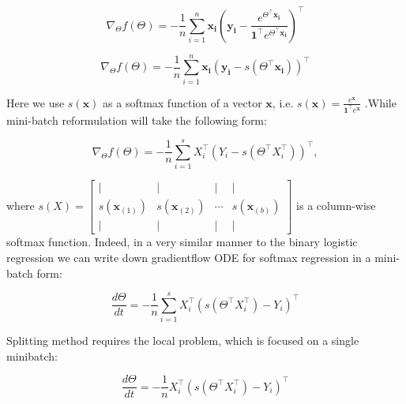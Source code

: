 \documentclass{article}
\newcommand{\vect}[1]{\boldsymbol{\mathbf{#1}}}
\begin{document}
\begin{equation}
\nabla_\Theta f(\Theta) = -\frac{1}{n} \sum_{i=1}^n\vect{x_i}\left(\vect{y_i} - \frac{ e^{\Theta^\top \vect{x_i}}}{\vect{1}^\top e^{\Theta^\top \vect{x_i}}}\right)^\top
\end{equation}

\begin{equation}
\nabla_\Theta f(\Theta) = -\frac{1}{n} \sum_{i=1}^n\vect{x_i}\left(\vect{y_i} - s\left(\Theta^\top \vect{x_i}\right)\right)^\top
\end{equation}


Here we use $s(\vect{x})$ as a softmax function of a vector $\vect{x}$, i.e. $s(\vect{x}) = \frac{e^{\vect{x}}}{\vect{1}^\top e^{\vect{x}}}$ .While mini-batch reformulation will take the following form:

\begin{equation}
\nabla_\Theta f(\Theta) = -\frac{1}{n} \sum_{i=1}^s X_i^\top\left(Y_i - s(\Theta^\top X_i^\top)\right)^\top,
\end{equation}

where $s(X) = \left[\begin{array}{cccc}| & | & | & | \\
s(\vect{x}_{(1)}) & s(\vect{x}_{(2)}) & \cdots & s(\vect{x}_{(b)}) \\
| & | & | & |
\end{array}\right]$ is a column-wise softmax function. Indeed, in a very similar manner to the binary logistic regression we can write down gradientflow ODE for softmax regression in a mini-batch form:

\begin{equation}
\frac{d \Theta}{d t} = - \frac{1}{n} \sum_{i=1}^s X_i^\top\left(s(\Theta^\top X_i^\top) - Y_i \right)^\top
\end{equation}

Splitting method requires the local problem, which is focused on a single minibatch:

\begin{equation}
\frac{d \Theta}{d t} = - \frac{1}{n} X_i^\top\left(s(\Theta^\top X_i^\top) - Y_i \right)^\top
\end{equation}
\end{document}
